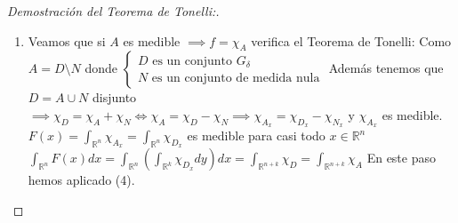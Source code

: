 \begin{proof}[Demostración del Teorema de Tonelli:]
\begin{enumerate}
Veamos que el Teorema de Tonelli se verifia cuando $f = \chi_N : N \subset
    \mathbb{R}^{n+k}$ es un conjunto de medida nula. \\ Supongamos entonce que
$m_{n+k}(N) = 0 \implies \forall j \in \mathbb{N}$ por la regularidad $\exists
    G_j \subset \mathbb{R}^{n+k}$-abierto con $N \subset G_j \text{ y }
    m_{n+k}(G_j) < \frac{1}{j}$. \\ Entonces, sea $G = \bigcup_{j \in
        \mathbb{N}}G_j$ que es un conjunto $G_{\delta}$ y $m_{n+k}(G) \leq m_{n+k}(G_j)
    < \frac{1}{j} \to 0$. \\ Luego $N \subset G$ y $m_{(n+k)}(G) = 0 \implies
    \text{por el apartado anterior } \chi_G$ satisface el Teorema de Tonelli. \\
Por último tenemos que $0 = m_{(n+k)(G)} = \int_{\mathbb{R}^{n+k}}\chi_G =
    \int_{\mathbb{R}^n}(\int_{\mathbb{R}^k}\chi_{N_x} dy)dx$. Sabemos que para casi
todo $x \in \mathbb{R}^n \widehat{F}(x)$ es medible y
$\int_{\mathbb{R}^n}\widehat{F}(x)dx = 0 \implies \widehat{F}(x) = 0$ en casi
todo punto de $\mathbb{R}^n$. Como $N_x = \{y \in \mathbb{R}^k : (x,y) \in N\}
    \subset G_x$ y $m_k(G_x) = \widehat{R}(x) = 0 \implies$ $N_x$ es un conjunto
nulo (luego medible) para casi todo $x \in \mathbb{R}^n$ es decir $\chi_{N_x}$
es medible. Además $0 \leq F(x) = \int_{\mathbb{R}^n} \chi_{N_x} \leq
    \int_{\mathbb{R}^n}\chi_{G_x} = 0 \implies F(x) = \int_{\mathbb{R}^n}\chi_{N_x}
    = 0$ en casi todo punto $x \in \mathbb{R}^n$ en particualr F es medible.
Finalmente, $0 = \int_{\mathbb{R^{n+k}}} \chi_N = \mathbb{R^n}F(x) dx =
    \int_{\mathbb{R}^n}(\int_{\mathbb{R}^k}\chi_{N_x}dy)dx$
\item Veamos que si $A$ es medible $\implies f = \chi_A$ verifica el Teorema de
Tonelli: Como $A = D \setminus N$ donde $\begin{cases}
        D \text{ es un conjunto } G_{\delta} \\
        N \text{ es un conjunto de medida nula}
    \end{cases}$ Además tenemos que $D = A \cup N$ disjunto $\implies \chi_D = \chi_A + \chi_N \iff \chi_A = \chi_D - \chi_N \implies \chi_{A_x} = \chi_{D_x} - \chi_{N_x}$ y $\chi_{A_x}$ es medible. \\
$F(x) = \int_{\mathbb{R}^n}\chi_{A_x} = \int_{\mathbb{R}^n}\chi_{D_x}$ es medible para casi todo $x \in \mathbb{R}^n$
$\int_{\mathbb{R}^n}F(x)dx = \int_{\mathbb{R}^n}(\int_{\mathbb{R}^k}\chi_{D_x}dy)dx = \int_{\mathbb{R}^{n+k}}\chi_D = \int_{\mathbb{R}^{n+k}}\chi_A$ En este paso hemos aplicado (4).


\end{enumerate}
\end{proof}

